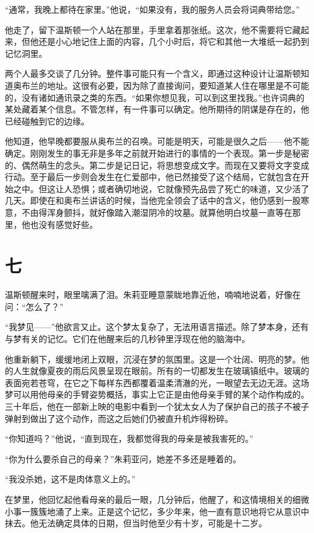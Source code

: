 ``通常，我晚上都待在家里。''他说，``如果没有，我的服务人员会将词典带给您。''

他走了，留下温斯顿一个人站在那里，手里拿着那张纸。这次，他不需要将它藏起来，但他还是小心地记住上面的内容，几个小时后，将它和其他一大堆纸一起扔到记忆洞里。

两个人最多交谈了几分钟。整件事可能只有一个含义，即通过这种设计让温斯顿知道奥布兰的地址。这很有必要，因为除了直接询问，要知道某人住在哪里是不可能的，没有诸如通讯录之类的东西。``如果你想见我，可以到这里找我。''也许词典的某处藏着某个信息。不管怎样，有一件事可以确定。他所期待的阴谋是存在的，他已经碰触到它的边缘。

他知道，他早晚都要服从奥布兰的召唤。可能是明天，可能是很久之后——他不能确定。刚刚发生的事无非是多年之前就开始进行的事情的一个表现。第一步是秘密的、偶然萌生的念头。第二步是记日记，将思想变成文字。而现在又要将文字变成行动。至于最后一步则会发生在仁爱部中，他已然接受了这个结局，它就包含在开始之中。但这让人恐惧；或者确切地说，它就像预先品尝了死亡的味道，又少活了几天。即使在和奥布兰讲话的时候，当他完全领会了话中的含义，他仍感到一股寒意，不由得浑身颤抖，就好像踏入潮湿阴冷的坟墓。就算他明白坟墓一直等在那里，他也没有感觉好些。

\section*{七}\label{ux5341ux4e94}

温斯顿醒来时，眼里噙满了泪。朱莉亚睡意蒙眬地靠近他，喃喃地说着，好像在问：``怎么了？''

``我梦见——''他欲言又止。这个梦太复杂了，无法用语言描述。除了梦本身，还有与梦有关的记忆。它们在他醒来后的几秒钟里浮现在他的脑海中。

他重新躺下，缓缓地闭上双眼，沉浸在梦的氛围里。这是一个壮阔、明亮的梦。他的人生就像夏夜的雨后风景呈现在眼前。所有的一切都发生在玻璃镇纸中。玻璃的表面宛若苍穹，在它之下每样东西都覆着温柔清澈的光，一眼望去无边无涯。这场梦可以用他母亲的手臂姿势概括，事实上它正是由他母亲手臂的某个动作构成的。三十年后，他在一部新上映的电影中看到一个犹太女人为了保护自己的孩子不被子弹射到做出了这个动作，而这之后她们仍被直升机炸得粉碎。

``你知道吗？''他说，``直到现在，我都觉得我的母亲是被我害死的。''

``你为什么要杀自己的母亲？''朱莉亚问，她差不多还是睡着的。

``我没杀她，这不是肉体意义上的。''

在梦里，他回忆起他看母亲的最后一眼，几分钟后，他醒了，和这情境相关的细微小事一簇簇地涌了上来。正是这个记忆，多少年来，他一直有意识地将它从意识中抹去。他无法确定具体的日期，但当时他至少有十岁，可能是十二岁。

